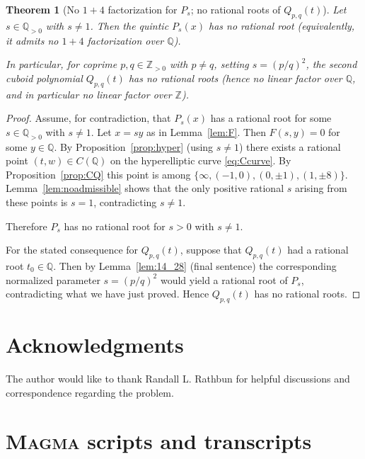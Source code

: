 \documentclass[12pt]{article}
\newtheorem{theorem}{Theorem}
\theoremstyle{remark}
\theoremstyle{definition}
\begin{document}
\begin{theorem}[No $1+4$ factorization for $P_s$; no rational roots of $Q_{p,q}(t)$]\label{thm:main}
Let $s\in\mathbb{Q}_{>0}$ with $s\neq 1$.
Then the quintic $P_s(x)$ has no rational root (equivalently, it admits no $1+4$ factorization over $\mathbb{Q}$).

In particular, for coprime $p,q\in\mathbb{Z}_{>0}$ with $p\neq q$, setting $s=(p/q)^2$, the second cuboid polynomial $Q_{p,q}(t)$ has no rational roots (hence no linear factor over $\mathbb{Q}$, and in particular no linear factor over $\mathbb{Z}$).
\end{theorem}

\begin{proof}
Assume, for contradiction, that $P_s(x)$ has a rational root for some $s\in\mathbb{Q}_{>0}$ with $s\neq 1$.
Let $x=sy$ as in Lemma~\ref{lem:F}.
Then $F(s,y)=0$ for some $y\in\mathbb{Q}$.
By Proposition~\ref{prop:hyper} (using $s\neq 1$) there exists a rational point $(t,w)\in C(\mathbb{Q})$ on the hyperelliptic curve \eqref{eq:Ccurve}.
By Proposition~\ref{prop:CQ} this point is among $\{\infty,(-1,0),(0,\pm1),(1,\pm8)\}$.
Lemma~\ref{lem:noadmissible} shows that the only positive rational $s$ arising from these points is $s=1$, contradicting $s\neq 1$.

Therefore $P_s$ has no rational root for $s>0$ with $s\neq 1$.

For the stated consequence for $Q_{p,q}(t)$, suppose that $Q_{p,q}(t)$ had a rational root $t_0\in\mathbb{Q}$.
Then by Lemma~\ref{lem:14_28} (final sentence) the corresponding normalized parameter $s=(p/q)^2$ would yield a rational root of $P_s$, contradicting what we have just proved.
Hence $Q_{p,q}(t)$ has no rational roots.
\end{proof}


\section*{Acknowledgments}
The author would like to thank Randall L. Rathbun for helpful discussions and correspondence regarding the problem.


\appendix
\section{\textsc{Magma} scripts and transcripts}\label{app:scripts}
\end{document}
